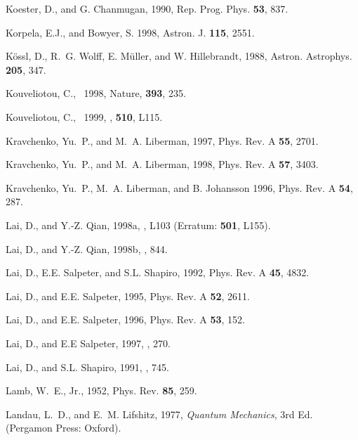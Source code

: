 \begin{references}
\harvarditem{}{}{}
Koester, D., and G. Chanmugan, 1990, Rep. Prog. Phys. {\bf 53}, 837.


\harvarditem{}{}{}
Korpela, E.J., and Bowyer, S. 1998, Astron. J. {\bf 115}, 2551.

\harvarditem{}{}{}
K\"ossl, D., R.~G. Wolff, E. M\"uller, and W. Hillebrandt, 1988,
Astron. Astrophys. {\bf 205}, 347.

\harvarditem{}{}{}
Kouveliotou, C., \etal~1998, Nature, {\bf 393}, 235.

\harvarditem{}{}{}
Kouveliotou, C., \etal~1999, \apj, {\bf 510}, L115.

\harvarditem{}{}{}
Kravchenko, Yu.~P., and M.~A. Liberman, 1997, Phys. Rev. A {\bf 55}, 2701.

\harvarditem{}{}{}
Kravchenko, Yu.~P., and M.~A. Liberman, 1998, Phys. Rev. A {\bf 57}, 3403.

\harvarditem{}{}{}
Kravchenko, Yu.~P., M.~A. Liberman, and B. Johansson 1996, Phys. Rev. 
A {\bf 54}, 287.

\harvarditem{}{}{}
Lai, D., and Y.-Z. Qian, 1998a, , L103 (Erratum: {\bf 501},
L155).

\harvarditem{}{}{}
Lai, D., and Y.-Z. Qian, 1998b, , 844.

\harvarditem{}{}{}
Lai, D., E.E. Salpeter, and S.L. Shapiro, 1992, Phys. Rev. A {\bf 45},
4832.

\harvarditem{}{}{}
Lai, D., and E.E. Salpeter, 1995, Phys. Rev. A {\bf 52}, 2611.

\harvarditem{}{}{}
Lai, D., and E.E. Salpeter, 1996, Phys. Rev. A {\bf 53}, 152.

\harvarditem{}{}{}
Lai, D., and E.E Salpeter, 1997, , 270.

\harvarditem{}{}{}
Lai, D., and S.L. Shapiro, 1991, , 745.

\harvarditem{}{}{}
Lamb, W.~E., Jr., 1952, Phys. Rev. {\bf 85}, 259.

\harvarditem{}{}{}
Landau, L.~D., and E.~M. Lifshitz, 1977, {\it Quantum Mechanics}, 3rd Ed. 
(Pergamon Press: Oxford).


\end{references}
